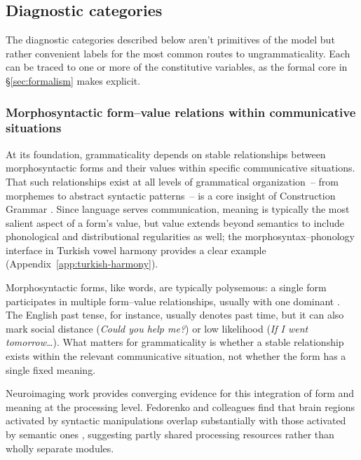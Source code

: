 \documentclass[12pt,letterpaper]{article}
\newcommand{\mention}[1]{\textit{#1}}
\begin{document}
\subsection{Diagnostic categories}\label{sec:core-components}

The diagnostic categories described below aren't primitives of the model but rather convenient labels for the most common routes to ungrammaticality. Each can be traced to one or more of the constitutive variables, as the formal core in \S\ref{sec:formalism} makes explicit.

\subsubsection{Morphosyntactic form--value relations within communicative situations}\label{sec:f-m-pair-in-community}

At its foundation, grammaticality depends on stable relationships between morphosyntactic forms and their values within specific communicative situations. That such relationships exist at all levels of grammatical organization~-- from morphemes to abstract syntactic patterns~-- is a core insight of Construction Grammar \autocite{goldberg1995constructions}. Since language serves communication, meaning is typically the most salient aspect of a form's value, but value extends beyond semantics to include phonological and distributional regularities as well; the morphosyntax--phonology interface in Turkish vowel harmony provides a clear example (Appendix~\ref{app:turkish-harmony}).

Morphosyntactic forms, like words, are typically polysemous: a single form participates in multiple form--value relationships, usually with one dominant \autocite{Kilgarriff2004}. The English past tense, for instance, usually denotes past time, but it can also mark social distance (\mention{Could you help me?}) or low likelihood (\mention{If I went tomorrow\dots}). What matters for grammaticality is whether a stable relationship exists within the relevant communicative situation, not whether the form has a single fixed meaning.

Neuroimaging work provides converging evidence for this integration of form and meaning at the processing level. Fedorenko and colleagues find that brain regions activated by syntactic manipulations overlap substantially with those activated by semantic ones \autocite{Fedorenko2011, Fedorenko2012, Fedorenko2024}, suggesting partly shared processing resources rather than wholly separate modules.
\end{document}
